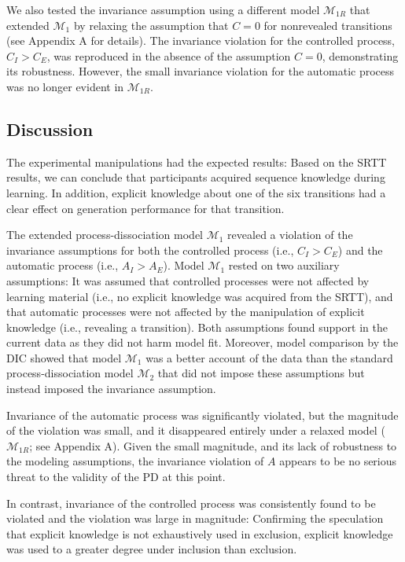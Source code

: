 \documentclass[man]{apa6}
\theoremstyle{definition}
\theoremstyle{definition}
\theoremstyle{definition}
\theoremstyle{remark}
\begin{document}
We also tested the invariance assumption using a different model
\(\mathcal{M}_{1R}\) that extended \(\mathcal{M}_1\) by relaxing the
assumption that \(C = 0\) for nonrevealed transitions (see Appendix A
for details). The invariance violation for the controlled process,
\(C_I > C_E\), was reproduced in the absence of the assumption \(C=0\),
demonstrating its robustness. However, the small invariance violation
for the automatic process was no longer evident in \(\mathcal{M}_{1R}\).

\subsection{Discussion}\label{discussion-1}

The experimental manipulations had the expected results: Based on the
SRTT results, we can conclude that participants acquired sequence
knowledge during learning. In addition, explicit knowledge about one of
the six transitions had a clear effect on generation performance for
that transition.

The extended process-dissociation model \(\mathcal{M}_1\) revealed a
violation of the invariance assumptions for both the controlled process
(i.e., \(C_I > C_E\)) and the automatic process (i.e., \(A_I > A_E\)).
Model \(\mathcal{M}_1\) rested on two auxiliary assumptions: It was
assumed that controlled processes were not affected by learning material
(i.e., no explicit knowledge was acquired from the SRTT), and that
automatic processes were not affected by the manipulation of explicit
knowledge (i.e., revealing a transition). Both assumptions found support
in the current data as they did not harm model fit. Moreover, model
comparison by the DIC showed that model \(\mathcal{M}_1\) was a better
account of the data than the standard process-dissociation model
\(\mathcal{M}_2\) that did not impose these assumptions but instead
imposed the invariance assumption.

Invariance of the automatic process was significantly violated, but the
magnitude of the violation was small, and it disappeared entirely under
a relaxed model (\(\mathcal{M}_{1R}\); see Appendix A). Given the small
magnitude, and its lack of robustness to the modeling assumptions, the
invariance violation of \(A\) appears to be no serious threat to the
validity of the PD at this point.

In contrast, invariance of the controlled process was consistently found
to be violated and the violation was large in magnitude: Confirming the
speculation that explicit knowledge is not exhaustively used in
exclusion, explicit knowledge was used to a greater degree under
inclusion than exclusion.
\end{document}
